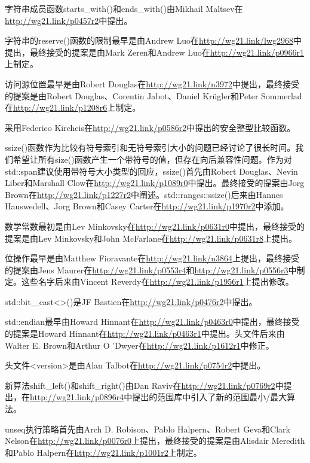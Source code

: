 字符串成员函数starts\_with()和ends\_with()由Mikhail Maltsev在\url{http://wg21.link/p0457r2}中提出。

字符串的reserve()函数的限制最早是由Andrew Luo在\url{http://wg21.link/lwg2968}中提出，最终接受的提案是由Mark Zeren和Andrew Luo在\url{http://wg21.link/p0966r1}上制定。

访问源位置最早是由Robert Douglas在\url{http://wg21.link/n3972}中提出，最终接受的提案是由Robert Douglas、Corentin Jabot、Daniel Kr{\"u}gler和Peter Sommerlad在\url{http://wg21.link/p1208r6}上制定。

采用Federico Kircheis在\url{http://wg21.link/p0586r2}中提出的安全整型比较函数。

ssize()函数作为比较有符号索引和无符号索引大小的问题已经讨论了很长时间。我们希望让所有size()函数产生一个带符号的值，但存在向后兼容性问题。作为对std::span建议使用带符号大小类型的回应，ssize()首先由Robert Douglas、Nevin Liber和Marshall Clow在\url{http://wg21.link/p1089r0}中提出。最终接受的提案由Jorg Brown在\url{http://wg21.link/p1227r2}中阐述。std::ranges::ssize()后来由Hannes Hauswedell、Jorg Brown和Casey Carter在\url{http://wg21.link/p1970r2}中添加。

数学常数最初是由Lev Minkovsky在\url{http://wg21.link/p0631r0}中提出，最终接受的提案是由Lev Minkovsky和John McFarlane在\url{http://wg21.link/p0631r8}上提出。

位操作最早是由Matthew Fioravante在\url{http://wg21.link/n3864}上提出，最终接受的提案由Jens Maurer在\url{http://wg21.link/p0553r4}和\url{http://wg21.link/p0556r3}中制定。这些名字后来由Vincent Reverdy在\url{http://wg21.link/p1956r1}上提出修改。

std::bit＿cast<>()是JF Bastien在\url{http://wg21.link/p0476r2}中提出。

std::endian最早由Howard Hinnant在\url{http://wg21.link/p0463r0}中提出，最终接受的提案是Howard Hinnant在\url{http://wg21.link/p0463r1}中提出。头文件后来由Walter E. Brown和Arthur O 'Dwyer在\url{http://wg21.link/p1612r1}中修正。

头文件<version>是由Alan Talbot在\url{http://wg21.link/p0754r2}中提出。

新算法shift\_left()和shift\_right()由Dan Raviv在\url{http://wg21.link/p0769r2}中提出，在\url{http://wg21.link/p0896r4}中提出的范围库中引入了新的范围最小/最大算法。

unseq执行策略首先由Arch D. Robison、Pablo Halpern、Robert Geva和Clark Nelson在\url{http://wg21.link/p0076r0}上提出，最终接受的提案是由Alisdair Meredith和Pablo Halpern在\url{http://wg21.link/p1001r2}上制定。
